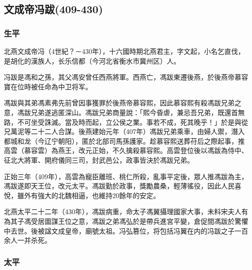 
\subsection{文成帝冯跋\tiny(409-430)}

\subsubsection{生平}

北燕文成帝冯（4世紀？－430年），十六國時期北燕君主，字文起，小名乞直伐，是胡化的漢族人，长乐信都（今河北省衡水市冀州区）人。

冯跋是馮和之孫，其父馮安曾任西燕將軍。西燕亡，馮跋東遷後燕，於後燕帝慕容寶在位時被任命為中卫将军。

馮跋與其弟馮素弗先前曾因事獲罪於後燕帝慕容熙，因此慕容熙有殺馮跋兄弟之意，馮跋兄弟遂逃匿深山。馮跋兄弟商量說：「熙今昏虐，兼忌吾兄弟，既還首無路，不可坐受誅滅。當及時而起，立公侯之業。事若不成，死其晚乎！」於是與從兄萬泥等二十二人合謀。後燕建始元年（407年）馮跋兄弟乘車，由婦人禦，潛入都城和龙（今辽宁朝阳），匿於北部司馬孫護家。趁慕容熙送葬苻后之際起事，推高雲（慕容雲）為燕王，改元正始，不久擒殺慕容熙。高雲登位後以馮跋為侍中、征北大將軍、開府儀同三司，封武邑公，政事皆決於馮跋兄弟。

正始三年（409年），高雲為寵臣離班、桃仁所殺，亂事平定後，眾人推馮跋為主，馮跋遂即天王位，改元太平。馮跋勤於政事，獎勵農桑，輕薄徭役，因此人民喜悅，雖外有強大的北魏相逼，也維持20餘年的安定。

北燕太平二十二年（430年），馮跋病重，命太子馮翼攝理國家大事，未料宋夫人有為其子馮受居圖謀王位之意，馮跋之弟馮弘於是帶兵進宮平變，倉促間馮跋於驚懼中去世。後被諡文成皇帝，廟號太祖。冯弘篡位，将包括冯翼在内的冯跋之子一百余人一并杀死。

\subsubsection{太平}

